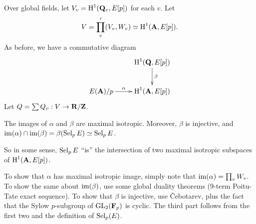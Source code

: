 Over global fields, let $V_v=\operatorname{H}^1(\mathbf{Q}_v,E[p])$ for each $v$. Let 
\[
  V = \prod_v' (V_v,W_v) \simeq \operatorname{H}^1(\mathbf{A},E[p]) .
\]
As before, we have a commutative diagram 
\[\xymatrix{
  & \h^1(\dQ,E[p]) \ar[d]^-\beta \\
  E(\dA)/p \ar[r]^-\alpha 
    & \h^1(\dA,E[p])
}\]
Let $Q=\sum Q_v:V\to \mathbf{R}/\mathbf{Z}$. 

\begin{theorem}
The images of $\alpha$ and $\beta$ are maximal isotropic. Moreover, $\beta$ is 
injective, and $\operatorname{im}(\alpha)\cap \operatorname{im}(\beta) = \beta(\operatorname{Sel}_p E)\simeq \operatorname{Sel}_p E$. 
\end{theorem}

So in some sense, $\operatorname{Sel}_p E$ ``is'' the intersection of two maximal isotropic 
subspaces of $\operatorname{H}^1(\mathbf{A},E[p])$. 

To show that $\alpha$ has maximal isotropic image, simply note that 
$\operatorname{im}(\alpha)=\prod_v W_v$. To show the same about $\operatorname{im}(\beta)$, use some global 
duality theorems (9-term Poitu-Tate exact sequence). To show that $\beta$ is 
injective, use \v Cebotarev, plus the fact that the Sylow $p$-subgroup of 
$\operatorname{GL}_2(\mathbf{F}_p)$ is cyclic. The third part follows from the first 
two and the definition of $\operatorname{Sel}_p(E)$. 




